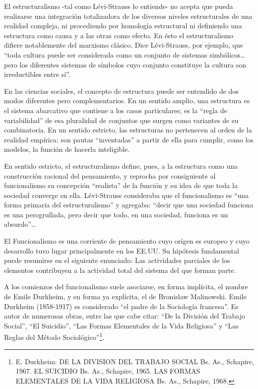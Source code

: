 \documentclass[
]{book}
\begin{document}
El estructuralismo -tal como Lévi-Strauss lo entiende- no acepta que pueda realizarse una integración totalizadora de los diversos niveles estructurales de una realidad compleja, ni procediendo por homología estructural ni definiendo una estructura como causa y a las otras como efecto. En ésto el estructuralismo difiere notablemente del marxismo clásico. Dice Lévi-Strauss, por ejemplo, que ``toda cultura puede ser considerada como un conjunto de sistemas simbólicos\ldots pero los diferentes sistemas de símbolos cuyo conjunto constituye la cultura son irreductibles entre sí''.

En las ciencias sociales, el concepto de estructura puede ser entendido de dos modos diferentes pero complementarios. En un sentido amplio, una estructura es el sistema abarcativo que contiene a los casos particulares; es la ``regla de variabilidad'' de esa pluralidad de conjuntos que surgen como variantes de su combinatoria. En un sentido estricto, las estructuras no pertenecen al orden de la realidad empírica: son pautas ``inventadas'' a partir de ella para cumplir, como los modelos, la función de hacerla inteligible.

En sentido estricto, el estructuralismo define, pues, a la estructura como una construcción racional del pensamiento, y reprocha por consiguiente al funcionalismo su concepción ``realista'' de la función y su idea de que toda la sociedad converge en ella. Lévi-Strauss consideraba que el funcionalismo es ``una forma primaria del estructuralismo'' y agregaba: ``decir que una sociedad funciona es una perogrullada, pero decir que todo, en una sociedad, funciona es un absurdo''\ldots{}

El Funcionalismo es una corriente de pensamiento cuyo orígen es europeo y cuyo desarrollo tuvo lugar principalmente en los EE.UU. Su hipótesis fundamental puede resumirse en el siguiente enunciado: Las actividades parciales de los elementos contribuyen a la actividad total del sistema del que forman parte.

A los comienzos del funcionalismo suele asociarse, en forma implícita, el nombre de Emile Durkheim, y en forma ya explícita, el de Bronislaw Malinowski. Emile Durkheim (1858-1917) es considerado ``el padre de la Sociología francesa''. Es autor de numerosas obras, entre las que cabe citar: ``De la División del Trabajo Social'', ``El Suicidio'', ``Las Formas Elementales de la Vida Religiosa'' y ``Las Reglas del Método Sociológico''\footnote{E. Durkheim: DE LA DIVISION DEL TRABAJO SOCIAL Bs. As., Schapire, 1967.
  EL SUICIDIO Bs. As., Schapire, 1965.
  LAS FORMAS ELEMENTALES DE LA VIDA RELIGIOSA Bs. As., Schapire, 1968.}.
\end{document}
